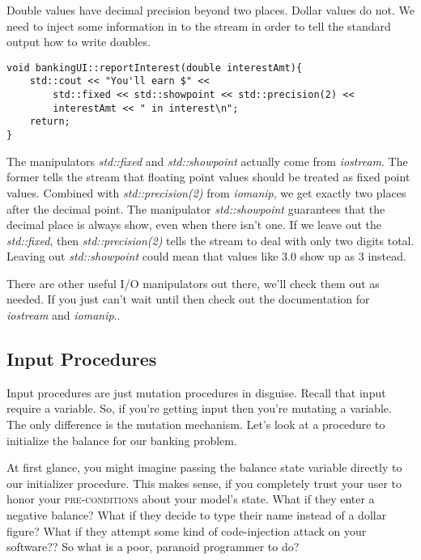 \documentclass[]{tufte-handout}
\begin{document}
Double values have decimal precision beyond two places. Dollar values do not. We need to inject some information in to the stream in order to tell the standard output how to write doubles. 
\begin{verbatim}
void bankingUI::reportInterest(double interestAmt){
	std::cout << "You'll earn $" << 
	    std::fixed << std::showpoint << std::precision(2) <<
	    interestAmt << " in interest\n";	
	return; 
}
\end{verbatim}
The manipulators \textit{std::fixed} and \textit{std::showpoint} actually come from \textit{iostream}. The former tells the stream that floating point values should be treated as fixed point values. Combined with \textit{std::precision(2)} from \textit{iomanip}, we get exactly two places after the decimal point. The manipulator \textit{std::showpoint} guarantees that the decimal place is always show, even when there isn't one. If we leave out the \textit{std::fixed}, then \textit{std::precision(2)} tells the stream to deal with only two digits total. Leaving out \textit{std::showpoint} could mean that values like $3.0$ show up as $3$ instead.

There are other useful I/O manipulators out there, we'll check them out as needed. If you just can't wait until then check out the documentation for \textit{iostream} and \textit{iomanip}..

\subsection{Input Procedures}

Input procedures are just mutation procedures in disguise. Recall that input require a variable. So, if you're getting input then you're mutating a variable. The only difference is the mutation mechanism. Let's look at a procedure to initialize the balance for our banking problem. 

At first glance, you might imagine passing the balance state variable directly to our initializer procedure. This makes sense, if you completely trust your user to honor your \textsc{pre-conditions} about your model's state. What if they enter a negative balance? What if they decide to type their name instead of a dollar figure? What if they attempt some kind of code-injection attack on your software??  So what is a poor, paranoid programmer to do?
\end{document}

